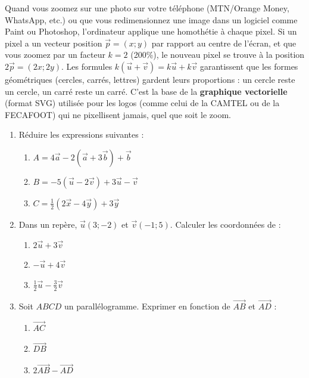 \documentclass[11pt]{article}
\begin{document}
\begin{savaistu}
Quand vous zoomez sur une photo sur votre téléphone (MTN/Orange Money, WhatsApp, etc.) ou que vous redimensionnez une image dans un logiciel comme Paint ou Photoshop, l'ordinateur applique une homothétie à chaque pixel.
Si un pixel a un vecteur position $\vec{p} = (x ; y)$ par rapport au centre de l'écran, et que vous zoomez par un facteur $k=2$ (200\%), le nouveau pixel se trouve à la position $2\vec{p} = (2x ; 2y)$. Les formules $k(\vec{u}+\vec{v}) = k\vec{u}+k\vec{v}$ garantissent que les formes géométriques (cercles, carrés, lettres) gardent leurs proportions : un cercle reste un cercle, un carré reste un carré. C'est la base de la \textbf{graphique vectorielle} (format SVG) utilisée pour les logos (comme celui de la CAMTEL ou de la FECAFOOT) qui ne pixellisent jamais, quel que soit le zoom.
\end{savaistu}

\begin{exercice}
\begin{enumerate}
    \item Réduire les expressions suivantes :
    \begin{enumerate}
        \item $A = 4\vec{a} - 2(\vec{a} + 3\vec{b}) + \vec{b}$
        \item $B = -5(\vec{u} - 2\vec{v}) + 3\vec{u} - \vec{v}$
        \item $C = \frac{1}{2}(2\vec{x} - 4\vec{y}) + 3\vec{y}$
    \end{enumerate}
    \item Dans un repère, $\vec{u}(3 ; -2)$ et $\vec{v}(-1 ; 5)$. Calculer les coordonnées de :
    \begin{enumerate}
        \item $2\vec{u} + 3\vec{v}$
        \item $- \vec{u} + 4\vec{v}$
        \item $\frac{1}{2}\vec{u} - \frac{3}{2}\vec{v}$
    \end{enumerate}
    \item Soit $ABCD$ un parallélogramme. Exprimer en fonction de $\overrightarrow{AB}$ et $\overrightarrow{AD}$ :
    \begin{enumerate}
        \item $\overrightarrow{AC}$
        \item $\overrightarrow{DB}$
        \item $2\overrightarrow{AB} - \overrightarrow{AD}$
    \end{enumerate}
\end{enumerate}
\end{exercice}
\end{document}
